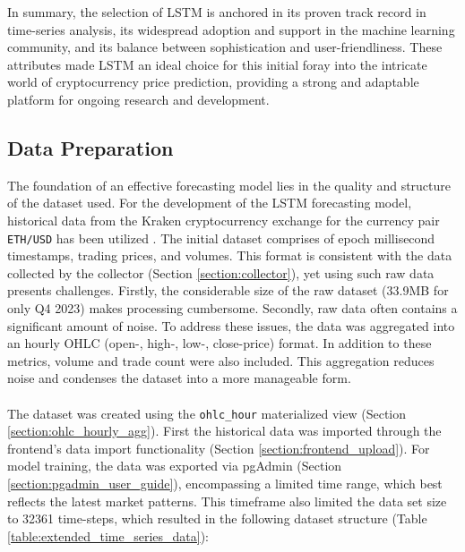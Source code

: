 In summary, the selection of LSTM is anchored in its proven track record in time-series analysis, its widespread adoption and support in the machine learning community, and its balance between sophistication and user-friendliness. These attributes made LSTM an ideal choice for this initial foray into the intricate world of cryptocurrency price prediction, providing a strong and adaptable platform for ongoing research and development. \\

\subsection{Data Preparation}
\label{section:data_preparation}
The foundation of an effective forecasting model lies in the quality and structure of the dataset used. For the development of the LSTM forecasting model, historical data from the Kraken cryptocurrency exchange for the currency pair \texttt{ETH/USD} has been utilized \cite{Kraken2023}. The initial dataset comprises of epoch millisecond timestamps, trading prices, and volumes. This format is consistent with the data collected by the collector (Section \ref{section:collector}), yet using such raw data presents challenges. Firstly, the considerable size of the raw dataset (33.9MB for only Q4 2023) makes processing cumbersome. Secondly, raw data often contains a significant amount of noise.  To address these issues, the data was aggregated into an hourly OHLC (open-, high-, low-, close-price) format. In addition to these metrics, volume and trade count were also included. This aggregation reduces noise and condenses the dataset into a more manageable form. \\ \mbox{} \\
The dataset was created using the \texttt{ohlc\_hour} materialized view (Section \ref{section:ohlc_hourly_agg}). First the historical data was imported through the frontend's data import functionality (Section \ref{section:frontend_upload}). For model training, the data was exported via pgAdmin (Section \ref{section:pgadmin_user_guide}), encompassing a limited time range, which best reflects the latest market patterns. This timeframe also limited the data set size to 32361 time-steps, which resulted in the following dataset structure (Table \ref{table:extended_time_series_data}): 
\mbox{}
